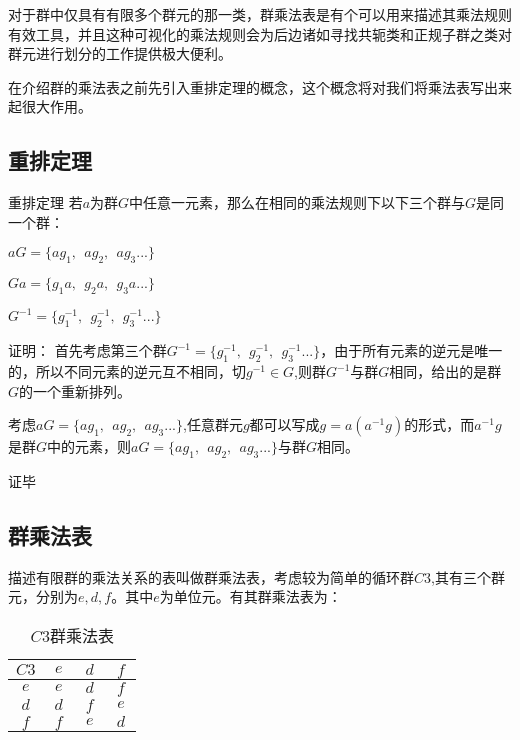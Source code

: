 

对于群中仅具有有限多个群元的那一类，群乘法表是有个可以用来描述其乘法规则有效工具，并且这种可视化的乘法规则会为后边诸如寻找共轭类和正规子群之类对群元进行划分的工作提供极大便利。

在介绍群的乘法表之前先引入重排定理的概念，这个概念将对我们将乘法表写出来起很大作用。

\subsection{重排定理}

\begin{theorem}{重排定理}
若$a$为群$G$中任意一元素，那么在相同的乘法规则下以下三个群与$G$是同一个群：

$aG=\{ag_1,~~ag_2,~~ag_3...\}$

$Ga=\{g_1a,~~g_2a,~~g_3a...\}$

$G^{-1}=\{g_1^{-1},~~g_2^{-1},~~g_3^{-1}...\}$
\end{theorem}

证明：
首先考虑第三个群$G^{-1}=\{g_1^{-1},~~g_2^{-1},~~g_3^{-1}...\}$，由于所有元素的逆元是唯一的，所以不同元素的逆元互不相同，切$g^{-1}\in G$,则群$G^{-1}$与群$G$相同，给出的是群$G$的一个重新排列。

考虑$aG=\{ag_1,~~ag_2,~~ag_3...\}$,任意群元$g$都可以写成$g=a(a^{-1}g)$的形式，而$a^{-1}g$是群$G$中的元素，则$aG=\{ag_1,~~ag_2,~~ag_3...\}$与群$G$相同。

证毕

\subsection{群乘法表}

描述有限群的乘法关系的表叫做群乘法表，考虑较为简单的循环群$C3$,其有三个群元，分别为$e,d,f$。其中$e$为单位元。有其群乘法表为：

\begin{table}[ht]
\centering
\caption{$C3$群乘法表}\label{tab_groupt_1}
\begin{tabular}{|c|c|c|c|}
\hline
$C3$ & $~e~$ & $~d~$ & $~f~$ \\
\hline
$e$ & $e$ & $d$ & $f$ \\
\hline
$d$ & $d$ & $f$ & $e$ \\
\hline
$f$ & $f$ & $e$ & $d$ \\
\hline
\end{tabular}
\end{table}

